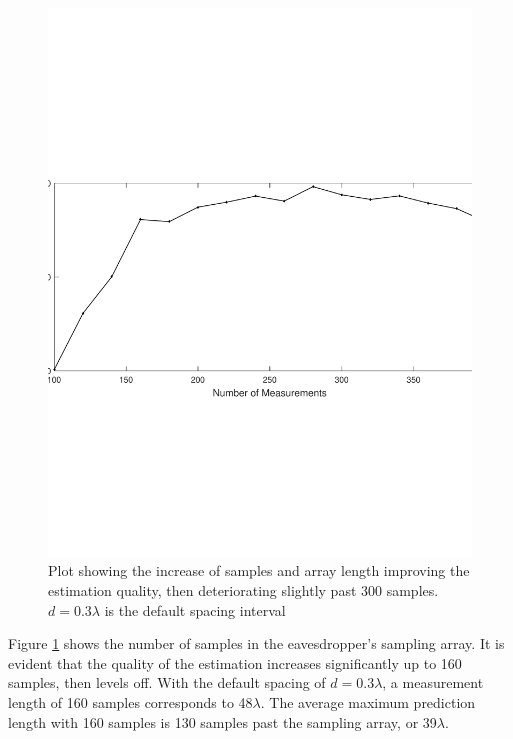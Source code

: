 \documentclass{allertonproc}
\begin{document}
\begin{figure}[tbp]
\begin{center}
\includegraphics[width=6in]{numMeasurements}
\caption{Plot showing the increase of samples and array length improving the estimation quality, then deteriorating slightly past 300 samples. $d = 0.3\lambda$ is the default spacing interval}\label{M}
\end{center}
\end{figure}
Figure \ref{M} shows the number of samples in the eavesdropper's sampling array. It is evident that the quality of the estimation increases significantly up to 160 samples, then levels off. With the default spacing of $d = 0.3\lambda$, a measurement length of 160 samples corresponds to 48$\lambda$. The average maximum prediction length with 160 samples is 130 samples past the sampling array, or 39$\lambda$.
\end{document}
